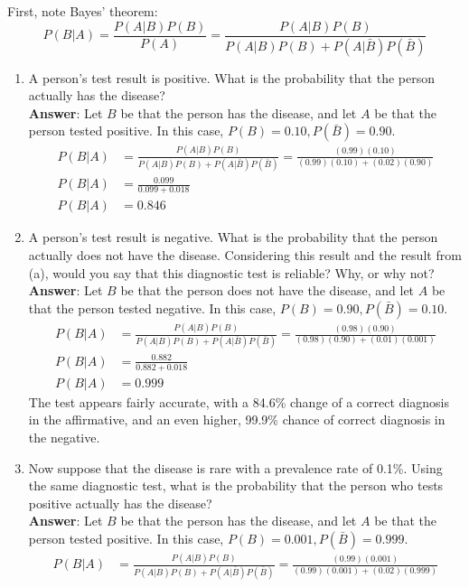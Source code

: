 \documentclass{article}
\begin{document}
			First, note Bayes' theorem:
			\[ P(B|A) = \frac{P(A|B) P(B)}{P(A)} = \frac{P(A|B) P(B)}{P(A|B){P(B) + P(A|\bar{B})P(\bar{B})}} \]
			\begin{enumerate}[\ \ (a)\ ]
				\item A person's test result is positive. What is the probability that the person actually has the disease?\\
				\textbf{Answer}:  Let $B$ be that the person has the disease, and let $A$ be that the person tested positive. In this case, $P(B) = 0.10, P(\bar{B}) = 0.90$.
				\begin{align*}
					P(B|A) &= \frac{P(A|B) P(B)}{P(A|B){P(B) + P(A|\bar{B})P(\bar{B})}} = \frac{(0.99)(0.10)}{(0.99)(0.10) + (0.02)(0.90)}\\
					P(B|A) &= \frac{0.099}{0.099+0.018}\\
					P(B|A) &= 0.846
				\end{align*}
				\item A person's test result is negative. What is the probability that the person actually does not have the disease. Considering this result and the result from (a), would you say that this diagnostic test is reliable? Why, or why not?\\
				\textbf{Answer}:  Let $B$ be that the person does not have the disease, and let $A$ be that the person tested negative. In this case, $P(B) = 0.90, P(\bar{B}) = 0.10$.
				\begin{align*}
				P(B|A) &= \frac{P(A|B) P(B)}{P(A|B){P(B) + P(A|\bar{B})P(\bar{B})}} = \frac{(0.98)(0.90)}{(0.98)(0.90) + (0.01)(0.001)}\\
				P(B|A) &= \frac{0.882}{0.882+0.018}\\
				P(B|A) &= 0.999
				\end{align*}
				The test appears fairly accurate, with a 84.6\% change of a correct diagnosis in the affirmative, and an even higher, 99.9\% chance of correct diagnosis in the negative.
				\pagebreak
				\item Now suppose that the disease is rare with a prevalence rate of 0.1\%. Using the same diagnostic test, what is the probability that the person who tests positive actually has the disease?\\
				\textbf{Answer}:  Let $B$ be that the person has the disease, and let $A$ be that the person tested positive. In this case, $P(B) = 0.001, P(\bar{B}) = 0.999$.
				\begin{align*}
				P(B|A) &= \frac{P(A|B) P(B)}{P(A|B){P(B) + P(A|\bar{B})P(\bar{B})}} = \frac{(0.99)(0.001)}{(0.99)(0.001) + (0.02)(0.999)}\\

\end{align*}
\end{enumerate}
\end{document}
